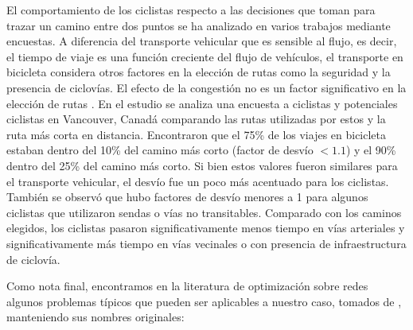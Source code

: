   El comportamiento de los ciclistas respecto a las decisiones que toman para trazar un camino entre dos puntos se ha analizado en varios trabajos mediante encuestas. A diferencia del transporte vehicular que es sensible al flujo, es decir, el tiempo de viaje es una función creciente del flujo de vehículos, el transporte en bicicleta considera otros factores en la elección de rutas como la seguridad y la presencia de ciclovías. El efecto de la congestión no es un factor significativo en la elección de rutas \parencite{broach2012}. En el estudio \parencite{winters2010} se analiza una encuesta a ciclistas y potenciales ciclistas en Vancouver, Canadá comparando las rutas utilizadas por estos y la ruta más corta en distancia. Encontraron que el 75\% de los viajes en bicicleta estaban dentro del 10\% del camino más corto (factor de desvío $< 1.1$) y el 90\% dentro del 25\% del camino más corto. Si bien estos valores fueron similares para el transporte vehicular, el desvío fue un poco más acentuado para los ciclistas. También se observó que hubo factores de desvío menores a 1 para algunos ciclistas que utilizaron sendas o vías no transitables. Comparado con los caminos elegidos, los ciclistas pasaron significativamente menos tiempo en vías arteriales y significativamente más tiempo en vías vecinales o con presencia de infraestructura de ciclovía.


  Como nota final, encontramos en la literatura de optimización sobre redes algunos problemas típicos que pueden ser aplicables a nuestro caso, tomados de \parencite{crainic2021}, manteniendo sus nombres originales:

